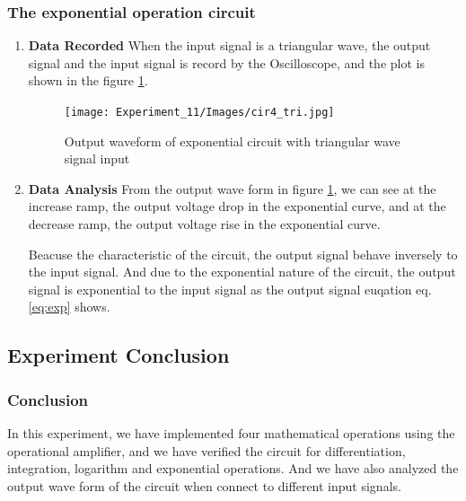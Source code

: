     \subsubsection{The exponential operation circuit}
    \begin{enumerate}
        \item \textbf{Data Recorded}\newline
            When the input signal is a triangular wave, the output signal and the input signal is record by the Oscilloscope, and the plot is shown in the figure \ref{wave:exp}.
            \begin{figure}[H]
                \centering
                \texttt{[image: Experiment\_11/Images/cir4\_tri.jpg]}
                \caption{Output waveform of exponential circuit with triangular wave signal input}
                \label{wave:exp}
            \end{figure}
        \item \textbf{Data Analysis}\newline
            From the output wave form in figure \ref{wave:exp}, we can see at the increase ramp, the output voltage drop in the exponential curve, and at the decrease ramp, the output voltage rise in the exponential curve.\par

            Beacuse the characteristic of the circuit, the output signal behave inversely to the input signal. And due to the exponential nature of the circuit, the output signal is exponential to the input signal as the output signal euqation eq.\ref{eq:exp} shows.\par
    \end{enumerate}

\subsection{Experiment Conclusion}
    \subsubsection{Conclusion}
        In this experiment, we have implemented four mathematical operations using the operational amplifier, and we have verified the circuit for differentiation, integration, logarithm and exponential operations. And we have also analyzed the output wave form of the circuit when connect to different input signals.\par